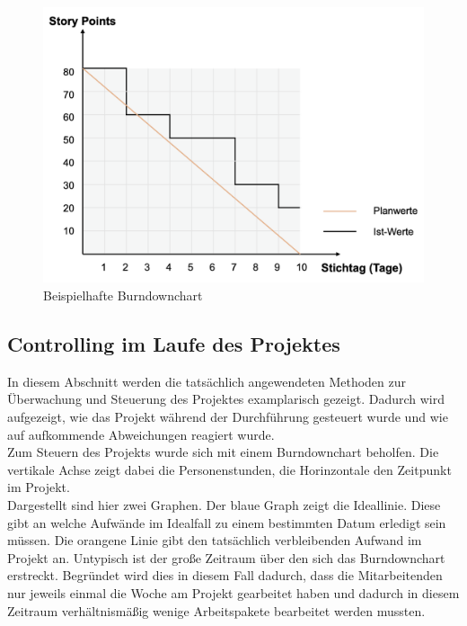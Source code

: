 \documentclass[ThesisDJ.tex]{subfiles}
\begin{document}
    \begin{figure}
        \includegraphics[scale=0.5]{burndown.png}
        \centering
        \caption{Beispielhafte Burndownchart}
        \label{fig:burndown}
    \end{figure}

    \subsection{Controlling im Laufe des Projektes}
    In diesem Abschnitt werden die tatsächlich angewendeten Methoden zur Überwachung und Steuerung des 
    Projektes examplarisch gezeigt. Dadurch wird aufgezeigt, wie das Projekt während der Durchführung gesteuert wurde 
    und wie auf aufkommende Abweichungen reagiert wurde.\\
    Zum Steuern des Projekts wurde sich mit einem Burndownchart beholfen. Die vertikale Achse zeigt dabei die Personenstunden, die Horinzontale den Zeitpunkt im Projekt.\\
Dargestellt sind hier zwei Graphen. Der blaue Graph zeigt die Ideallinie. Diese gibt an welche Aufwände im Idealfall zu einem bestimmten Datum erledigt sein müssen. Die orangene Linie gibt den tatsächlich verbleibenden Aufwand im Projekt an. Untypisch ist der große Zeitraum über den sich das Burndownchart erstreckt. Begründet wird dies in diesem Fall dadurch, dass die Mitarbeitenden nur jeweils einmal die Woche am Projekt gearbeitet haben und dadurch in diesem Zeitraum verhältnismäßig wenige Arbeitspakete bearbeitet werden mussten.
\end{document}
